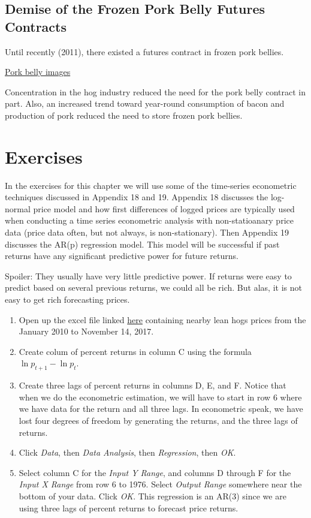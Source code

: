 \documentclass[
  letterpaper,
  DIV=11,
  numbers=noendperiod]{scrreprt}
\begin{document}
\subsection{Demise of the Frozen Pork Belly Futures
Contracts}\label{demise-of-the-frozen-pork-belly-futures-contracts}

Until recently (2011), there existed a futures contract in frozen pork
bellies.

\href{https://www.google.com/search?q=pork+belly&biw=1920&bih=1075&noj=1&source=lnms&tbm=isch&sa=X&ved=0CAgQ_AUoAmoVChMIhbO55IqdyQIVDNUeCh0_owNp}{Pork
belly images}

Concentration in the hog industry reduced the need for the pork belly
contract in part. Also, an increased trend toward year-round consumption
of bacon and production of pork reduced the need to store frozen pork
bellies.

\section{Exercises}\label{exercises-7}

In the exercises for this chapter we will use some of the time-series
econometric techniques discussed in Appendix 18 and 19. Appendix 18
discusses the log-normal price model and how first differences of logged
prices are typically used when conducting a time series econometric
analysis with non-statioanary price data (price data often, but not
always, is non-stationary). Then Appendix 19 discusses the AR(p)
regression model. This model will be successful if past returns have any
significant predictive power for future returns.

Spoiler: They usually have very little predictive power. If returns were
easy to predict based on several previous returns, we could all be rich.
But alas, it is not easy to get rich forecasting prices.

\begin{enumerate}
\def\labelenumi{\arabic{enumi}.}
\item
  Open up the excel file linked \href{Excel-files/LeanHogs.xlsx}{here}
  containing nearby lean hogs prices from the January 2010 to November
  14, 2017.
\item
  Create colum of percent returns in column C using the formula
  \(\ln{p_{t+1}} - \ln{p_{t}}\).
\item
  Create three lags of percent returns in columns D, E, and F. Notice
  that when we do the econometric estimation, we will have to start in
  row 6 where we have data for the return and all three lags. In
  econometric speak, we have lost four degrees of freedom by generating
  the returns, and the three lags of returns.
\item
  Click \emph{Data}, then \emph{Data Analysis}, then \emph{Regression},
  then \emph{OK}.
\item
  Select column C for the \emph{Input Y Range}, and columns D through F
  for the \emph{Input X Range} from row 6 to 1976. Select \emph{Output
  Range} somewhere near the bottom of your data. Click \emph{OK}. This
  regression is an AR(3) since we are using three lags of percent
  returns to forecast price returns.
\end{enumerate}
\end{document}

